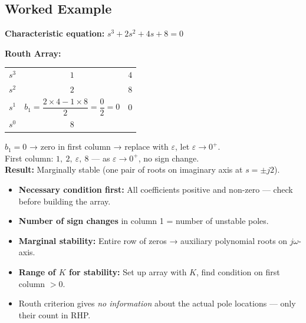 \documentclass[12pt,a4paper]{article}
\renewcommand{\arraystretch}{1.45}
\begin{document}
\subsection{Worked Example}

\begin{tcolorbox}[examplebox, title={Example — 3rd Order System}]
\textbf{Characteristic equation:} $s^3 + 2s^2 + 4s + 8 = 0$

\textbf{Routh Array:}
\renewcommand{\arraystretch}{1.3}
\begin{center}
\begin{tabular}{c|cc}
$s^3$ & $1$ & $4$ \\
$s^2$ & $2$ & $8$ \\
$s^1$ & $b_1 = \dfrac{2\times4 - 1\times8}{2} = \dfrac{0}{2} = 0$ & $0$ \\
$s^0$ & $8$ & \\
\end{tabular}
\end{center}

$b_1 = 0$ → zero in first column → replace with $\varepsilon$, let $\varepsilon\to 0^+$.\\
First column: $1,\ 2,\ \varepsilon,\ 8$ — as $\varepsilon\to 0^+$, no sign change.\\
\textbf{Result:} Marginally stable (one pair of roots on imaginary axis at $s = \pm j2$).
\end{tcolorbox}

\begin{tcolorbox}[exambox, title={Exam Tips — Routh Criterion}]
\begin{itemize}[leftmargin=*, itemsep=3pt, topsep=0pt]
  \item \textbf{Necessary condition first:} All coefficients positive and non-zero — check before building the array.
  \item \textbf{Number of sign changes} in column 1 = number of unstable poles.
  \item \textbf{Marginal stability:} Entire row of zeros → auxiliary polynomial roots on $j\omega$-axis.
  \item \textbf{Range of $K$ for stability:} Set up array with $K$, find condition on first column $> 0$.
  \item Routh criterion gives \textit{no information} about the actual pole locations — only their count in RHP.
\end{itemize}
\end{tcolorbox}

\end{document}
